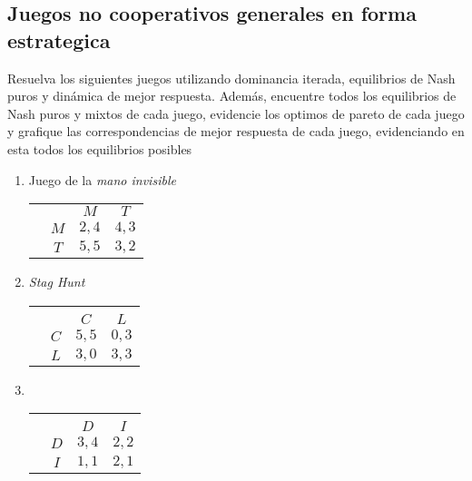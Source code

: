 \documentclass[11pt]{article}
\begin{document}
\begin{flushleft}
\section{Juegos no cooperativos generales en forma estrategica}
\begin{flushleft}
    Resuelva los siguientes juegos utilizando dominancia iterada, equilibrios de Nash puros y dinámica de mejor respuesta. Además, encuentre todos los equilibrios de Nash puros y mixtos de cada juego, evidencie los optimos de pareto de cada juego y grafique las correspondencias de mejor respuesta de cada juego, evidenciando en esta todos los equilibrios posibles
\end{flushleft}
\begin{enumerate}[label=\roman*)]
    \item Juego de la \textit{mano invisible}\\
    \begin{center}    
        \setlength{\extrarowheight}{0pt}
        \begin{tabular}{cc|c|c|}
            & \multicolumn{1}{c}{} & \multicolumn{1}{c}{$M$}  & \multicolumn{1}{c}{$T$} \\\cline{3-4}
            & $M$ & $2,4$ & $4,3$ \\\cline{3-4}
            & $T$ & $5,5$ & $3,2$ \\\cline{3-4}
        \end{tabular}
    \end{center}
    \item \textit{Stag Hunt}\\
    \begin{center}    
        \setlength{\extrarowheight}{0pt}
        \begin{tabular}{cc|c|c|}
            & \multicolumn{1}{c}{}\\
            & \multicolumn{1}{c}{} & \multicolumn{1}{c}{$C$}  & \multicolumn{1}{c}{$L$} \\\cline{3-4}
            & $C$ & $5,5$ & $0,3$ \\\cline{3-4}
            & $L$ & $3,0$ & $3,3$ \\\cline{3-4}
        \end{tabular}
    \end{center}
    \item ~\\
    \begin{center}    
        \setlength{\extrarowheight}{0pt}
        \begin{tabular}{cc|c|c|}
            & \multicolumn{1}{c}{}\\
            & \multicolumn{1}{c}{} & \multicolumn{1}{c}{$D$}  & \multicolumn{1}{c}{$I$} \\\cline{3-4}
            & $D$ & $3,4$ & $2,2$ \\\cline{3-4}
            & $I$ & $1,1$ & $2,1$ \\\cline{3-4}
        \end{tabular}
    \end{center}
\end{enumerate}


\end{flushleft}
\end{document}
